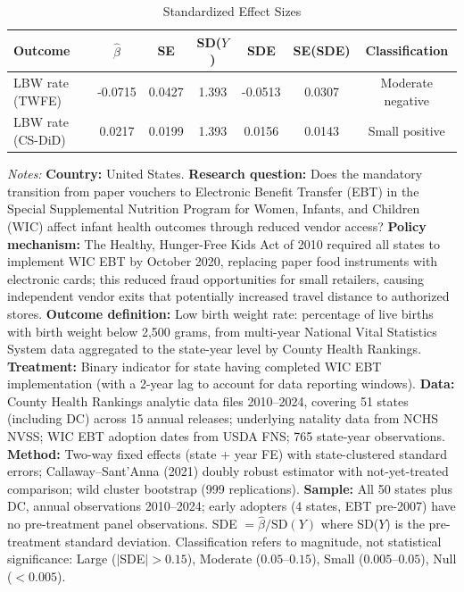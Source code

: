 \begin{table}[htbp]
\centering
\caption{Standardized Effect Sizes}
\label{tab:sde}
\begin{tabular}{lcccccc}
\hline\hline
Outcome & $\hat{\beta}$ & SE & SD($Y$) & SDE & SE(SDE) & Classification \\
\hline
LBW rate (TWFE) & -0.0715 & 0.0427 & 1.393 & -0.0513 & 0.0307 & Moderate negative \\
LBW rate (CS-DiD) & 0.0217 & 0.0199 & 1.393 & 0.0156 & 0.0143 & Small positive \\
\hline\hline
\end{tabular}
\begin{tablenotes}[flushleft]
\small
\item \textit{Notes:} \textbf{Country:} United States. \textbf{Research question:} Does the mandatory transition from paper vouchers to Electronic Benefit Transfer (EBT) in the Special Supplemental Nutrition Program for Women, Infants, and Children (WIC) affect infant health outcomes through reduced vendor access? \textbf{Policy mechanism:} The Healthy, Hunger-Free Kids Act of 2010 required all states to implement WIC EBT by October 2020, replacing paper food instruments with electronic cards; this reduced fraud opportunities for small retailers, causing independent vendor exits that potentially increased travel distance to authorized stores. \textbf{Outcome definition:} Low birth weight rate: percentage of live births with birth weight below 2,500 grams, from multi-year National Vital Statistics System data aggregated to the state-year level by County Health Rankings. \textbf{Treatment:} Binary indicator for state having completed WIC EBT implementation (with a 2-year lag to account for data reporting windows). \textbf{Data:} County Health Rankings analytic data files 2010--2024, covering 51 states (including DC) across 15 annual releases; underlying natality data from NCHS NVSS; WIC EBT adoption dates from USDA FNS; 765 state-year observations. \textbf{Method:} Two-way fixed effects (state + year FE) with state-clustered standard errors; Callaway--Sant'Anna (2021) doubly robust estimator with not-yet-treated comparison; wild cluster bootstrap (999 replications). \textbf{Sample:} All 50 states plus DC, annual observations 2010--2024; early adopters (4 states, EBT pre-2007) have no pre-treatment panel observations. SDE $= \hat{\beta} / \text{SD}(Y)$ where SD($Y$) is the pre-treatment standard deviation. Classification refers to magnitude, not statistical significance: Large ($|$SDE$| > 0.15$), Moderate ($0.05$--$0.15$), Small ($0.005$--$0.05$), Null ($< 0.005$).
\end{tablenotes}
\end{table}

